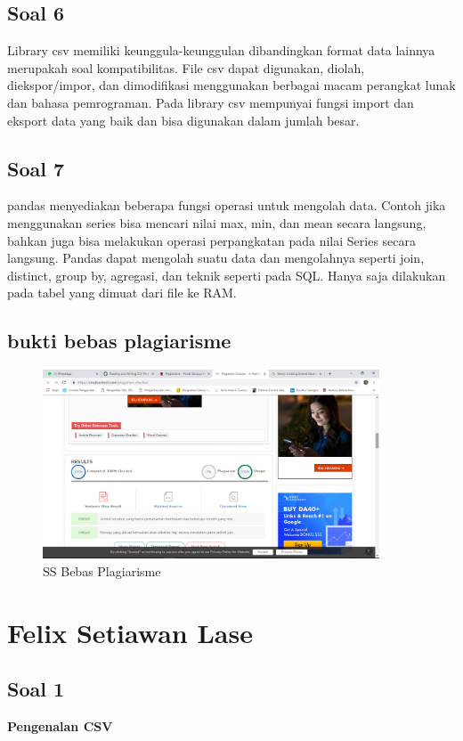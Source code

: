 \subsection{Soal 6}
 Library csv memiliki keunggula-keunggulan dibandingkan format data lainnya merupakah soal kompatibilitas. File csv dapat digunakan, diolah, diekspor/impor, dan dimodifikasi menggunakan berbagai macam perangkat lunak dan bahasa pemrograman. Pada library csv mempunyai fungsi import dan eksport data yang baik dan bisa digunakan dalam jumlah besar.

\subsection{Soal 7}
pandas menyediakan beberapa fungsi operasi untuk mengolah data. Contoh jika menggunakan series bisa mencari nilai max, min, dan mean secara langsung, bahkan juga bisa melakukan operasi perpangkatan pada nilai Series secara langsung.
Pandas dapat mengolah suatu data dan mengolahnya seperti join, distinct, group by, agregasi, dan teknik seperti pada SQL. Hanya saja dilakukan pada tabel yang dimuat dari file ke RAM.


\subsection{bukti bebas plagiarisme}
\begin{figure}[H]
\centering
\includegraphics[width=10cm]{figures/4/1174012/Teori/ss1.png}
\caption{SS Bebas Plagiarisme}
\label{damara}
\end{figure}
\section{Felix Setiawan Lase}
\subsection{Soal 1}
\textbf{Pengenalan CSV}

